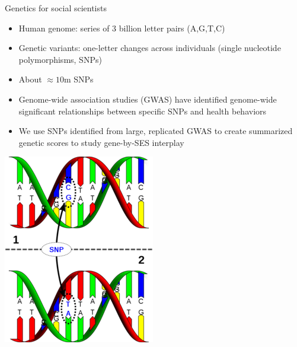 \documentclass[10pt,compress,xcolor=dvipsnames,aspectratio=169]{beamer}    %
\newcounter{ex}
\newcommand{\1}[1]{\mathrm{1\hspace*{-2.5pt}l}[#1]}	%
\begin{document}
\begin{frame}{Genetics for social scientists} \label{frame:genetics}

    \begin{minipage}{.7\textwidth}
\begin{itemize}
	\item Human genome: series of 3 billion letter pairs (A,G,T,C)
	\item Genetic variants: one-letter changes across individuals (single nucleotide polymorphisms, SNPs)
	\item About $\approx 10$m SNPs \cite{1000Genomes2015}
	\item Genome-wide association studies (GWAS) have identified genome-wide significant relationships between specific SNPs and health behaviors
	\item We use SNPs identified from large, replicated GWAS to create summarized genetic scores to study gene-by-SES interplay \hyperlink{fig:manhattan2}{}
\end{itemize}
    \end{minipage}
    \begin{minipage}{.2\textwidth}
      \includegraphics[scale=0.4]{SNP2}
    \end{minipage}

\end{frame}


\end{document}
